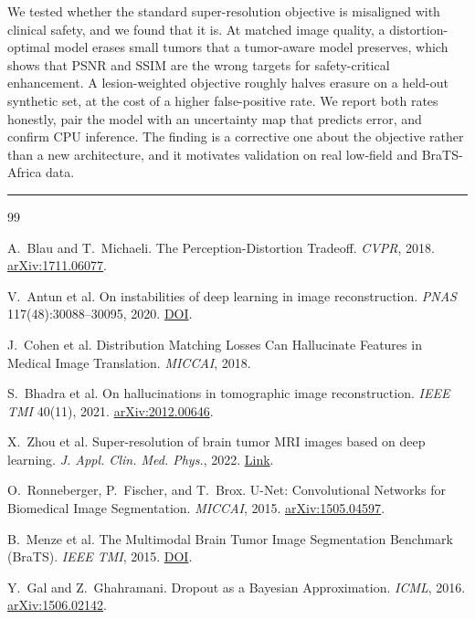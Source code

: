 \documentclass[11pt,a4paper]{article}
\newcommand{\thinrule}{\noindent\textcolor{rule}{\rule{\linewidth}{0.6pt}}}
\newcommand{\SR}{super-resolution\xspace}
\begin{document}
We tested whether the standard \SR objective is misaligned with clinical safety, and we found that it is. At matched image quality, a distortion-optimal model erases small tumors that a tumor-aware model preserves, which shows that PSNR and SSIM are the wrong targets for safety-critical enhancement. A lesion-weighted objective roughly halves erasure on a held-out synthetic set, at the cost of a higher false-positive rate. We report both rates honestly, pair the model with an uncertainty map that predicts error, and confirm CPU inference. The finding is a corrective one about the objective rather than a new architecture, and it motivates validation on real low-field and BraTS-Africa data.

\thinrule

\begin{thebibliography}{99}\small

 A.~Blau and T.~Michaeli. The Perception-Distortion Tradeoff. \textit{CVPR}, 2018. \href{https://arxiv.org/abs/1711.06077}{arXiv:1711.06077}.

 V.~Antun et al. On instabilities of deep learning in image reconstruction. \textit{PNAS} 117(48):30088--30095, 2020. \href{https://doi.org/10.1073/pnas.1907377117}{DOI}.

 J.~Cohen et al. Distribution Matching Losses Can Hallucinate Features in Medical Image Translation. \textit{MICCAI}, 2018.

 S.~Bhadra et al. On hallucinations in tomographic image reconstruction. \textit{IEEE TMI} 40(11), 2021. \href{https://arxiv.org/abs/2012.00646}{arXiv:2012.00646}.

 X.~Zhou et al. Super-resolution of brain tumor MRI images based on deep learning. \textit{J. Appl. Clin. Med. Phys.}, 2022. \href{https://aapm.onlinelibrary.wiley.com/doi/full/10.1002/acm2.13758}{Link}.

 O.~Ronneberger, P.~Fischer, and T.~Brox. U-Net: Convolutional Networks for Biomedical Image Segmentation. \textit{MICCAI}, 2015. \href{https://arxiv.org/abs/1505.04597}{arXiv:1505.04597}.

 B.~Menze et al. The Multimodal Brain Tumor Image Segmentation Benchmark (BraTS). \textit{IEEE TMI}, 2015. \href{https://doi.org/10.1109/TMI.2014.2377694}{DOI}.

 Y.~Gal and Z.~Ghahramani. Dropout as a Bayesian Approximation. \textit{ICML}, 2016. \href{https://arxiv.org/abs/1506.02142}{arXiv:1506.02142}.


\end{thebibliography}
\end{document}
